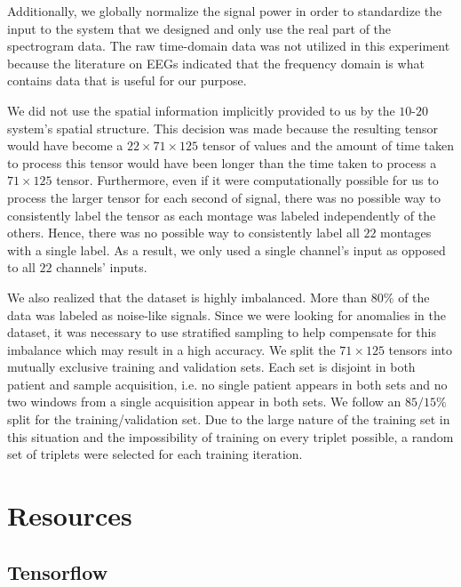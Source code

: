 Additionally, we globally normalize the signal power in order to standardize the input to the system that we designed and only use the real part of the spectrogram data. The raw time-domain data was not utilized in this experiment because the literature \cite{eegs_info, eeg_info2, eeg_info3, mayo_eegs} on EEGs indicated that the frequency domain is what contains data that is useful for our purpose.


We did not use the spatial information implicitly provided to us by the $10$-$20$ system's spatial structure. This decision was made because the resulting tensor would have become a $22 \times 71 \times 125$ tensor of values and the amount of time taken to process this tensor would have been longer than the time taken to process a $71 \times 125$ tensor. Furthermore, even if it were computationally possible for us to process the larger tensor for each second of signal, there was no possible way to consistently label the tensor as each montage was labeled independently of the others. Hence, there was no possible way to consistently label all $22$ montages with a single label. As a result, we only used a single channel's input as opposed to all $22$ channels' inputs. 

We also realized that the dataset is highly imbalanced. More than $80\%$ of the data was labeled as noise-like signals. Since we were looking for anomalies in the dataset, it was necessary to use stratified sampling to help compensate for this imbalance which may result in a high accuracy. We split the $71 \times 125$ tensors into mutually exclusive training and validation sets. Each set is disjoint in both patient and sample acquisition, i.e. no single patient appears in both sets and no two windows from a single acquisition appear in both sets. We follow an $85/15\%$ split for the training/validation set. Due to the large nature of the training set in this situation and the impossibility of training on every triplet possible, a random set of triplets were selected for each training iteration. 

\section{Resources}


\subsection*{Tensorflow}


